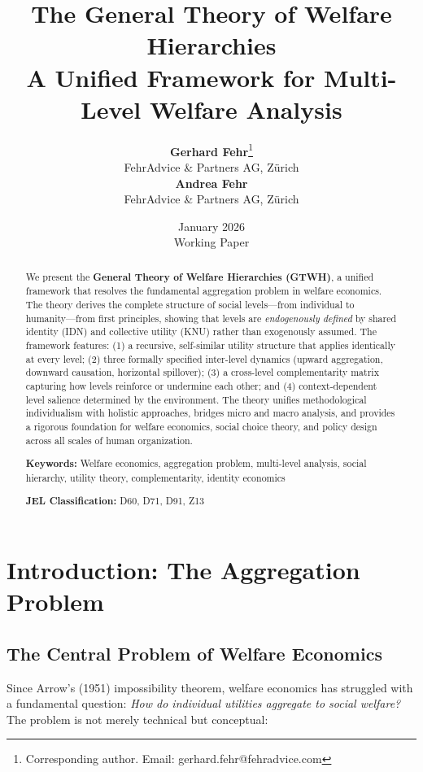 \documentclass[12pt,a4paper]{article}
\title{
\vspace{-2cm}
\textbf{\LARGE The General Theory of Welfare Hierarchies}\\[0.5em]
\large A Unified Framework for Multi-Level Welfare Analysis
}
\author{
\textbf{Gerhard Fehr}\thanks{Corresponding author. Email: gerhard.fehr@fehradvice.com}\\
FehrAdvice \& Partners AG, Zürich\\[0.5em]
\textbf{Andrea Fehr}\\
FehrAdvice \& Partners AG, Zürich
}
\date{January 2026\\[1em]
\small Working Paper}
\begin{document}
\maketitle

\begin{abstract}
\noindent
We present the \textbf{General Theory of Welfare Hierarchies (GTWH)}, a unified 
framework that resolves the fundamental aggregation problem in welfare economics. 
The theory derives the complete structure of social levels---from individual to 
humanity---from first principles, showing that levels are \emph{endogenously 
defined} by shared identity (IDN) and collective utility (KNU) rather than 
exogenously assumed. The framework features: (1) a recursive, self-similar 
utility structure that applies identically at every level; (2) three formally 
specified inter-level dynamics (upward aggregation, downward causation, 
horizontal spillover); (3) a cross-level complementarity matrix capturing 
how levels reinforce or undermine each other; and (4) context-dependent 
level salience determined by the environment. The theory unifies methodological 
individualism with holistic approaches, bridges micro and macro analysis, 
and provides a rigorous foundation for welfare economics, social choice theory, 
and policy design across all scales of human organization.

\vspace{1em}
\noindent\textbf{Keywords:} Welfare economics, aggregation problem, multi-level 
analysis, social hierarchy, utility theory, complementarity, identity economics

\noindent\textbf{JEL Classification:} D60, D71, D91, Z13
\end{abstract}

\newpage
\tableofcontents
\newpage

\section{Introduction: The Aggregation Problem}
\label{sec:introduction}

\subsection{The Central Problem of Welfare Economics}

Since Arrow's (1951) impossibility theorem, welfare economics has struggled 
with a fundamental question: \textit{How do individual utilities aggregate to 
social welfare?} The problem is not merely technical but conceptual:
\end{document}
